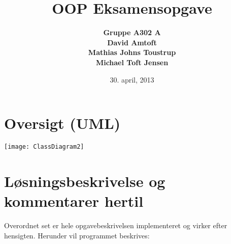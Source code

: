 \documentclass[11pt]{article}
\begin{document}
\title{OOP Eksamensopgave}
\author{\bf{Gruppe A302 A}\\David Amtoft\\Mathias Johns Toustrup\\Michael Toft Jensen}
\date{30. april, 2013}
\maketitle

\section{Oversigt (UML)}
\texttt{[image: ClassDiagram2]}

\section{Løsningsbeskrivelse og kommentarer hertil}
Overordnet set er hele opgavebeskrivelsen implementeret og virker efter hensigten. Herunder vil programmet beskrives:
\end{document}
